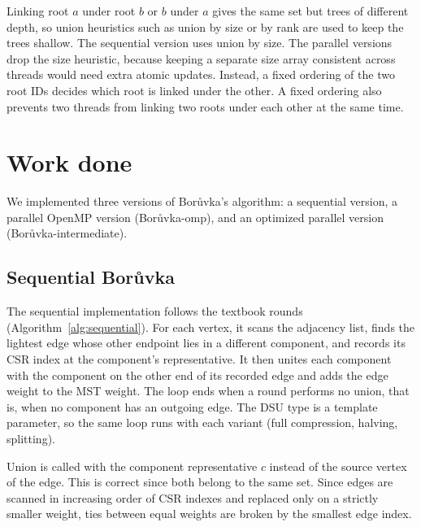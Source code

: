 \documentclass[11pt,a4paper]{article}
\begin{document}
Linking root $a$ under root $b$ or $b$ under $a$ gives the same set but trees of different depth, so union heuristics such as union by size or by rank are used to keep the trees shallow. The sequential version uses union by size. The parallel versions drop the size heuristic, because keeping a separate size array consistent across threads would need extra atomic updates. Instead, a fixed ordering of the two root IDs decides which root is linked under the other. A fixed ordering also prevents two threads from linking two roots under each other at the same time.

\section*{Work done}

We implemented three versions of Bor\r{u}vka's algorithm: a sequential version, a parallel OpenMP version (Bor\r{u}vka-omp), and an optimized parallel version (Bor\r{u}vka-intermediate).

\subsection*{Sequential Bor\r{u}vka}
The sequential implementation follows the textbook rounds (Algorithm~\ref{alg:sequential}). For each vertex, it scans the adjacency list, finds the lightest edge whose other endpoint lies in a different component, and records its CSR index at the component's representative. It then unites each component with the component on the other end of its recorded edge and adds the edge weight to the MST weight. The loop ends when a round performs no union, that is, when no component has an outgoing edge. The DSU type is a template parameter, so the same loop runs with each variant (full compression, halving, splitting).

Union is called with the component representative $c$ instead of the source vertex of the edge. This is correct since both belong to the same set. Since edges are scanned in increasing order of CSR indexes and replaced only on a strictly smaller weight, ties between equal weights are broken by the smallest edge index.
\end{document}
